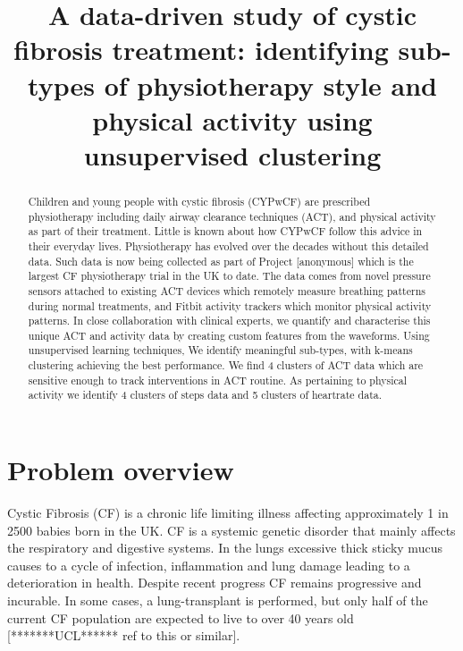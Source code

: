 \documentclass{article}
\title{A data-driven study of cystic fibrosis treatment: identifying sub-types of physiotherapy style and physical activity using unsupervised clustering}
\begin{document}
\maketitle

\begin{abstract}
  Children and young people with cystic fibrosis (CYPwCF) are prescribed physiotherapy including daily airway clearance techniques (ACT), and physical activity as part of their treatment. Little is known about how CYPwCF follow this advice in their everyday lives. Physiotherapy has evolved over the decades without this detailed data. Such data is now being collected as part of Project [anonymous] which is the largest CF physiotherapy trial in the UK to date. The data comes from novel pressure sensors attached to existing ACT devices which remotely measure breathing patterns during normal treatments, and Fitbit activity trackers which monitor physical activity patterns. In close collaboration with clinical experts, we quantify and characterise this unique ACT and activity data by creating custom features from the waveforms. Using unsupervised learning techniques, We identify meaningful sub-types, with k-means clustering achieving the best performance. We find 4 clusters of ACT data which are sensitive enough to track interventions in ACT routine. As pertaining to physical activity we identify 4 clusters of steps data and 5 clusters of heartrate data.
\end{abstract}

\section{Problem overview}

Cystic Fibrosis (CF) is a chronic life limiting illness affecting approximately 1 in 2500 babies born in the UK. CF is a systemic genetic disorder that mainly affects the respiratory and digestive systems. In the lungs excessive thick sticky mucus causes to a cycle of infection, inflammation and lung damage leading to a deterioration in health. Despite recent progress CF remains progressive and incurable. In some cases, a lung-transplant is performed, but only half of the current CF population are expected to live to over 40 years old [*******UCL****** ref to this or similar].  
\end{document}
